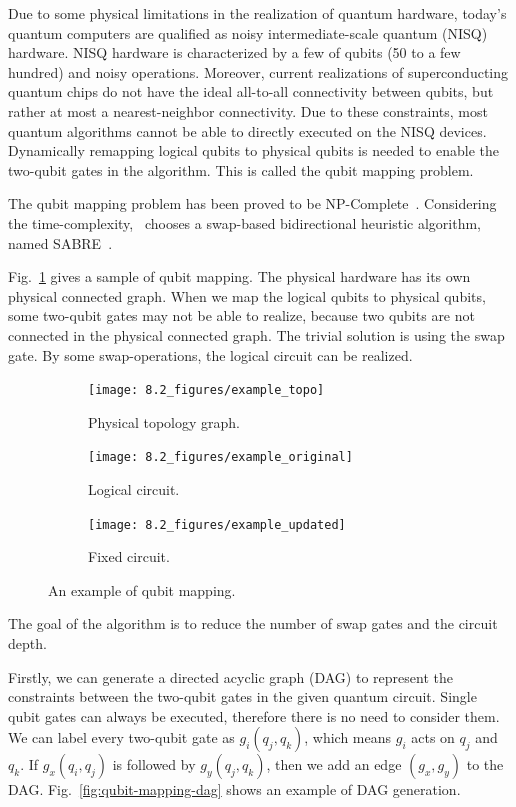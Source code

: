 
Due to some physical limitations in the realization of quantum hardware, today's quantum computers are qualified as noisy intermediate-scale quantum (NISQ) hardware. NISQ hardware is characterized by a few of qubits (50 to a few hundred) and noisy operations. Moreover, current realizations of superconducting quantum chips do not have the ideal all-to-all connectivity between qubits, but rather at most a nearest-neighbor connectivity. Due to these constraints, most quantum algorithms cannot be able to directly executed on the NISQ devices. Dynamically remapping logical qubits to physical qubits is needed to enable the two-qubit gates in the algorithm. This is called the qubit mapping problem.

The qubit mapping problem has been proved to be NP-Complete~\cite{siraichi2018qubit}. Considering the time-complexity, \MindQuantum\ chooses a swap-based bidirectional heuristic algorithm, named SABRE~\cite{li2019tackling}.

Fig.~\ref{fig:qubit-mapping-sample} gives a sample of qubit mapping.
The physical hardware has its own physical connected graph. When we map the logical qubits to physical qubits, some two-qubit gates may not be able to realize, because two qubits are not connected in the physical connected graph. The trivial solution is using the swap gate. By some swap-operations, the logical circuit can be realized.

\begin{figure}
	\centering
	\begin{subfigure}{0.1\textwidth}
		\centering
		\texttt{[image: 8.2\_figures/example\_topo]}
		\caption{Physical topology graph.}
	\end{subfigure}
	\begin{subfigure}{0.3\textwidth}
		\centering
		\texttt{[image: 8.2\_figures/example\_original]}
		\caption{Logical circuit.}
	\end{subfigure}

	\begin{subfigure}{0.45\textwidth}
		\centering
		\texttt{[image: 8.2\_figures/example\_updated]}
		\caption{Fixed circuit.}
	\end{subfigure}

	\caption{An example of qubit mapping.}
	\label{fig:qubit-mapping-sample}
\end{figure}

The goal of the algorithm is to reduce the number of swap gates and the circuit depth.

Firstly, we can generate a directed acyclic graph (DAG) to represent the constraints between the two-qubit gates in the given quantum circuit. Single qubit gates can always be executed, therefore there is no need to consider them. We can label every two-qubit gate as $g_i(q_j, q_k)$, which means $g_i$ acts on $q_j$ and $q_k$. If $g_x(q_i, q_j)$ is followed by $g_y(q_j, q_k)$, then we add an edge $(g_x, g_y)$ to the DAG. Fig.~\ref{fig:qubit-mapping-dag} shows an example of DAG generation.

